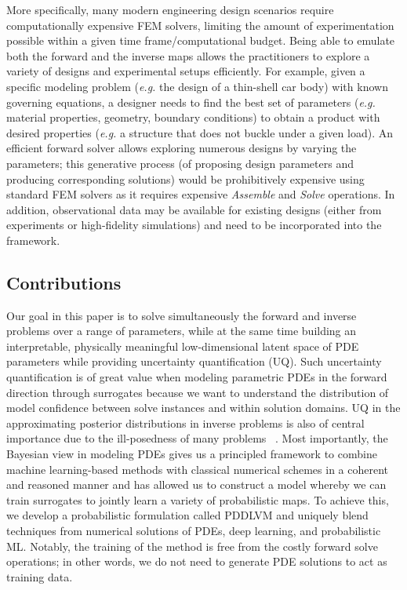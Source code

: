 \documentclass[11pt, fleqn]{article}
\begin{document}
More specifically, many modern engineering design scenarios require computationally expensive FEM solvers, limiting the amount of experimentation possible within a given time frame/computational budget. Being able to emulate both the forward and the inverse maps allows the practitioners to explore a variety of designs and experimental setups efficiently. For example, given a specific modeling problem (\emph{e.g.} the design of a thin-shell car body) with known governing equations, a designer needs to find the best set of parameters (\emph{e.g.} material properties, geometry, boundary conditions) to obtain a product with desired properties (\emph{e.g.} a structure that does not buckle under a given load). An efficient forward solver allows exploring numerous designs by varying the parameters; this generative process (of proposing design parameters and producing corresponding solutions) would be prohibitively expensive using standard FEM solvers as it requires expensive \textit{Assemble} and \textit{Solve} operations. In addition, observational data may be available for existing designs (either from experiments or high-fidelity simulations) and need to be incorporated into the framework.

\subsection{Contributions}
%
Our goal in this paper is to solve simultaneously the forward and inverse problems over a range of parameters, while at the same time building an interpretable, physically meaningful low-dimensional latent space of PDE parameters while providing uncertainty quantification (UQ). Such uncertainty quantification is of great value when modeling parametric PDEs in the forward direction through surrogates because we want to understand the distribution of model confidence between solve instances and within solution domains. UQ in the approximating posterior distributions in inverse problems is also of central importance due to the ill-posedness of many problems ~\cite{stuart_2010}. Most importantly, the Bayesian view in modeling PDEs gives us a principled framework to combine machine learning-based methods with classical numerical schemes in a coherent and reasoned manner and has allowed us to construct a model whereby we can train surrogates to jointly learn a variety of probabilistic maps. To achieve this, we develop a probabilistic formulation called \gls*{PDDLVM} and uniquely blend techniques from numerical solutions of PDEs, deep learning, and probabilistic ML. Notably, the training of the method is free from the costly forward solve operations; in other words, we do not need to generate PDE solutions to act as training data. 
\end{document}
